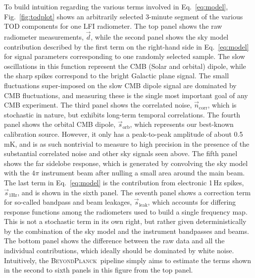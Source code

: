 \documentclass[twocolumn]{aa}
\renewcommand{\d}[0]{\vec{d}}
\newcommand{\n}[0]{\vec{n}}
\newcommand{\s}[0]{\vec{s}}
\newcommand{\BP}{\textsc{BeyondPlanck}}
\begin{document}
To build intuition regarding the various terms involved in
Eq.~\eqref{eq:model}, Fig.~\ref{fig:todplot} shows an arbitrarily
selected 3-minute segment of the various TOD components for one LFI
radiometer. The top panel shows the raw radiometer measurements, $\d$,
while the second panel shows the sky model contribution described by
the first term on the right-hand side in Eq.~\eqref{eq:model} for
signal parameters corresponding to one randomly selected sample. The
slow oscillations in this function represent the CMB (Solar and
orbital) dipole, while the sharp spikes correspond to the bright
Galactic plane signal. The small fluctuations super-imposed on the
slow CMB dipole signal are dominated by CMB fluctuations, and
measuring these is the single most important goal of any CMB
experiment. The third panel shows the correlated noise,
$\n_{\mathrm{corr}}$, which is stochastic in nature, but exhibits
long-term temporal correlations. The fourth panel shows the orbital
CMB dipole, $\s_{\mathrm{orb}}$, which represents our best-known
calibration source. However, it only has a peak-to-peak amplitude of
about 0.5\,mK, and is as such nontrivial to measure to high
precision in the presence of the substantial correlated
noise and other sky signals seen above. The fifth panel shows the far
sidelobe response, which is generated by convolving the sky model with
the $4\pi$ instrument beam after nulling a small area around the main
beam. The last term in Eq.~\eqref{eq:model} is the contribution from
electronic 1\,Hz spikes, $\s_{\mathrm{1Hz}}$, and is shown in the
sixth panel. The seventh panel shows a correction term for so-called
bandpass and beam leakages, $\s_{\mathrm{leak}}$, which accounts for
differing response functions among the radiometers used to build a
single frequency map. This is not a stochastic term in its own right,
but rather given deterministically by the combination of the sky model
and the instrument bandpasses and beams. The bottom panel shows the
difference between the raw data and all the individual contributions,
which ideally should be dominated by white noise. Intuitively, the
\BP\ pipeline simply aims to estimate the terms shown in the second to
sixth panels in this figure from the top panel.
\end{document}
